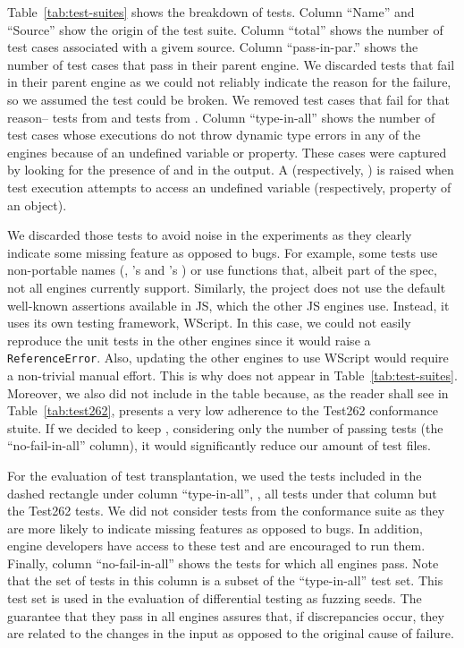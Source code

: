\documentclass[smallextended]{svjour3}
\begin{document}
Table~\ref{tab:test-suites} shows the breakdown of tests. Column
``Name'' and ``Source'' show the origin of the test suite. Column
``total'' shows the number of test cases associated with a givem
source. Column ``pass-in-par.''  shows the number of test cases that
pass in their parent engine. We discarded tests that fail in their
parent engine as we could not reliably indicate the reason for the
failure, so we assumed the test could be broken. We removed
\testsThatFail{} test cases that fail for that
reason--\testsThatFailJSC{} tests from \jsc and \testsThatFailSM{}
tests from \smonkey. Column ``type-in-all'' shows the number of test
cases whose executions do not throw dynamic type errors in any of the
engines because of an undefined variable or property.  These cases
were captured by looking for the presence of 
and  in the output. A 
(respectively, ) is raised when test execution
attempts to access an undefined variable (respectively, property of an
object).

We discarded those tests to avoid noise in the experiments as
they clearly indicate some missing feature as opposed to bugs. For
example, some tests use non-portable names (\eg{}, \jsc's
 and \smonkey{}'s )
or use functions that, albeit part of the spec, not all engines
currently support. Similarly, the \chakra project does not use
  the default well-known assertions available in JS, which the other
  JS engines use.  Instead, it uses its own testing framework,
  WScript. In this case, we could not easily reproduce the \chakra
  unit tests in the other engines since it would raise a
  \texttt{ReferenceError}. Also, updating the other engines to use
  WScript would require a non-trivial manual effort. This is why
  \chakra does not appear in Table~\ref{tab:test-suites}.
  Moreover, we also did not include \hermes in the table because,
  as the reader shall see in Table~\ref{tab:test262}, \hermes presents
  a very low adherence to the Test262 conformance stuite. If we decided
  to keep \hermes, considering only the number of passing tests
  (the ``no-fail-in-all'' column), it would significantly reduce our
  amount of test files.

For the evaluation of test transplantation, we used
the \totalTestFilesForTestTransplantation{} tests included in the
dashed rectangle under column ``type-in-all'', \ie{}, all tests under
that column but the Test262 tests. We did not consider tests from the
conformance suite as they are more likely to indicate missing features
as opposed to bugs. In addition, engine developers have access to
these test and are encouraged to run them. Finally, column
``no-fail-in-all'' shows the tests for which all engines pass. Note
that the set of tests in this column is a subset of the
``type-in-all'' test set. This test set is used in the evaluation of
differential testing as fuzzing seeds. The guarantee that they pass in
all engines assures that, if discrepancies occur, they are related to
the changes in the input as opposed to the original cause of failure.
\end{document}
